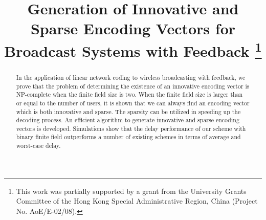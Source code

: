 \documentclass[letterpaper,conference,10pt]{IEEEtran}
\begin{document}
\title{Generation of Innovative and Sparse Encoding
Vectors for Broadcast Systems with Feedback
\thanks{This work was partially supported by a grant from the University Grants Committee of the Hong Kong Special Administrative Region, China (Project No. AoE/E-02/08).}}

\author{
 \and
{}
\and
{}
}

\IEEEoverridecommandlockouts


\maketitle



\begin{abstract}
In the application of linear network coding to wireless broadcasting with feedback, we prove that the problem of determining the existence of an innovative encoding vector is NP-complete when the finite field size is two. When the finite field size is larger than or equal to the number of users, it is shown that we can always find an encoding vector which is both innovative and sparse. The sparsity can be utilized in speeding up the decoding process.  An efficient algorithm to generate innovative and sparse encoding vectors is developed. Simulations show that the delay performance of our scheme with binary finite field outperforms a number of existing schemes in terms of average and worst-case delay.
\end{abstract}
\end{document}
